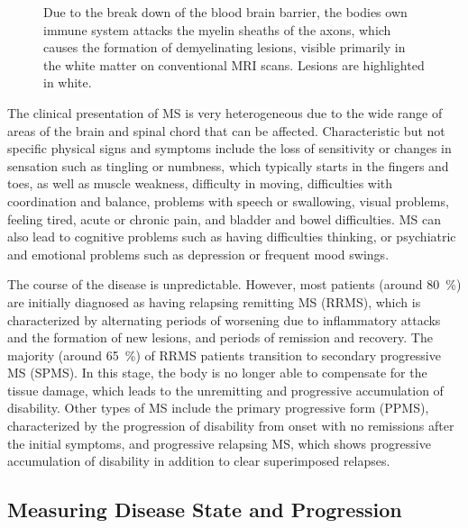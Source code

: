 \begin{figure}[tb]

\caption[Demyelination in MS]{Due to the break down of the blood brain barrier,
the bodies own immune system attacks the myelin sheaths of the axons, which
causes the formation of demyelinating lesions, visible primarily in the white
matter on conventional MRI scans. Lesions are highlighted in white.}
\end{figure}
 
The clinical presentation of MS is very heterogeneous due to the wide range of
areas of the brain and spinal chord that can be affected. Characteristic but not
specific physical signs and symptoms include the loss of sensitivity or changes
in sensation such as tingling or numbness, which typically starts in the fingers
and toes, as well as muscle weakness, difficulty in moving, difficulties with
coordination and balance, problems with speech or swallowing, visual problems,
feeling tired, acute or chronic pain, and bladder and bowel difficulties. MS can
also lead to cognitive problems such as having difficulties thinking, or
psychiatric and emotional problems such as depression or frequent mood swings.

The course of the disease is unpredictable. However, most patients (around
\SI{80}{\percent}) are initially diagnosed as having relapsing remitting MS
(RRMS), which is characterized by alternating periods of worsening due to
inflammatory attacks and the formation of new lesions, and periods of remission
and recovery. The majority (around \SI{65}{\percent}) of RRMS patients
transition to secondary progressive MS (SPMS). In this stage, the body is no
longer able to compensate for the tissue damage, which leads to the unremitting
and progressive accumulation of disability. Other types of MS include the
primary progressive form (PPMS), characterized by the progression of disability
from onset with no remissions after the initial symptoms, and progressive
relapsing MS, which shows progressive accumulation of disability in addition to
clear superimposed relapses.


\subsection{Measuring Disease State and Progression}

